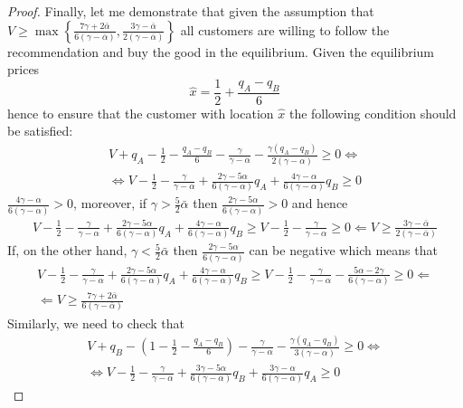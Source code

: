 \documentclass[a4paper]{article}
\begin{document}
\begin{proof}
	 
	 Finally, let me demonstrate that given the assumption that $V \ge \max \left\{\frac{7\gamma + 2\bar{\alpha}}{6(\gamma - \bar{\alpha})},  \frac{3 \gamma - \bar{\alpha}}{2(\gamma - \bar{\alpha})} \right\}$ all customers are willing to follow the recommendation and buy the good in the equilibrium. Given the equilibrium prices $$\hat{x} = \frac{1}{2} + \frac{q_A-q_B}{6}$$ hence to ensure that the customer with location $\hat{x}$ the following condition should be satisfied: \begin{align*}
	 V+q_A - \frac{1}{2} - \frac{q_A-q_B}{6} - \frac{\gamma}{\gamma - \alpha} - \frac{\gamma(q_A-q_B)}{2(\gamma- \alpha)} \ge 0 \iff\\
	 \iff V - \frac{1}{2} -\frac{\gamma}{\gamma - \alpha} + \frac{2 \gamma - 5 \alpha}{6(\gamma - \alpha)}q_A + \frac{4 \gamma - \alpha}{6(\gamma - \alpha)}q_B \ge 0
	 \end{align*}
	 $\frac{4 \gamma - \alpha}{6(\gamma - \alpha)} >0$, moreover, if $\gamma > \frac{5}{2} \bar{\alpha}$ then $\frac{2 \gamma - 5  \alpha}{6(\gamma - \alpha)} > 0$ and hence
	 \begin{align*}
	 V - \frac{1}{2} -\frac{\gamma}{\gamma - \alpha} + \frac{2 \gamma - 5 \alpha}{6(\gamma - \alpha)}q_A + \frac{4 \gamma - \alpha}{6(\gamma - \alpha)}q_B \ge V - \frac{1}{2} - \frac{\gamma}{\gamma - \alpha} \ge 0 \Leftarrow V \ge \frac{3 \gamma - \bar{\alpha}}{2(\gamma - \bar{\alpha})}
	 \end{align*}
	 If, on the other hand, $\gamma < \frac{5}{2} \bar{\alpha}$ then $\frac{2 \gamma - 5  \alpha}{6(\gamma - \alpha)}$ can be negative which means that
	 \begin{align*}
	 V - \frac{1}{2} -\frac{\gamma}{\gamma - \alpha} + \frac{2 \gamma - 5 \alpha}{6(\gamma - \alpha)}q_A + \frac{4 \gamma - \alpha}{6(\gamma - \alpha)}q_B \ge V - \frac{1}{2}- \frac{\gamma}{\gamma - \alpha} - \frac{5 \alpha - 2 \gamma}{6(\gamma - \alpha)} \ge 0 \Leftarrow \\
	 \Leftarrow V \ge \frac{7 \gamma + 2 \bar{\alpha}}{6(\gamma - \bar{\alpha})}
	 \end{align*}
	 Similarly, we need to check that 
	 \begin{align*}
	 V+q_B - \left(1-\frac{1}{2} - \frac{q_A - q_B}{6} \right) - \frac{\gamma}{\gamma - \alpha} - \frac{\gamma(q_A-q_B)}{3(\gamma - \alpha)} \ge 0 \iff\\
	 \iff V - \frac{1}{2} - \frac{\gamma}{\gamma-\alpha} + \frac{3 \gamma - 5 \alpha}{6(\gamma - \alpha)}q_B + \frac{3 \gamma - \alpha}{6(\gamma - \alpha)}q_A \ge 0
	 \end{align*}

\end{proof}
\end{document}

